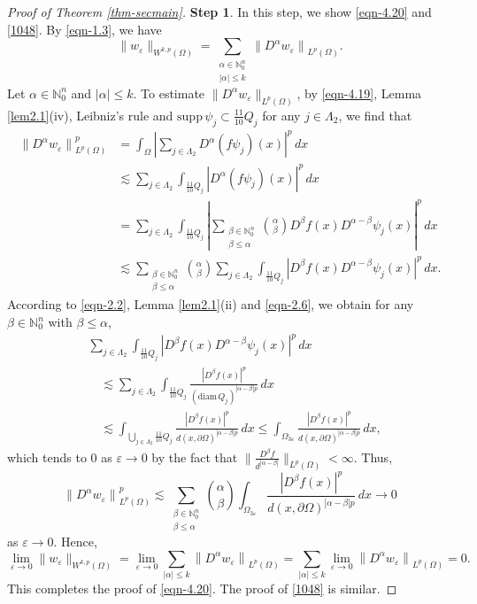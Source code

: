 \documentclass[11pt,twoside]{article}
\def\nn{{\mathbb N}}
\def\nno{\nn_0}
\def\Qj{\frac{11}{10}Q_j}
\def\az{\alpha}
\def\bz{\beta}
\def\boz{{\Omega}}
\def\pa{\partial}                %
\def\we{w_{\varepsilon}}
\def\huae{\varepsilon}
\theoremstyle{mylem}
\theoremstyle{definition}
\numberwithin{equation}{section}
\begin{document}
\begin{proof}[Proof of Theorem \ref{thm-secmain}]
{\bf Step 1}. In this step, we show \eqref{eqn-4.20}
and \eqref{1048}. By \eqref{eqn-1.3}, we have
\[
\| \we \|_{W^{k,p}(\boz)}=\sum_{\substack{\az\in\nno^n \\ |\alpha| \leq k}}
\left\| D^{\alpha}\we \right\|_{L^p(\Omega)}.
\]
Let $\az\in\nno^n$ and $|\az|\leq k$. To estimate \(\| D^{\alpha}\we \|_{L^p(\Omega)}\), by \eqref{eqn-4.19}, Lemma \ref{lem2.1}(iv), Leibniz's rule and \( \text{supp}\,\psi_j \subset \frac{11}{10}Q_j \) for any $j\in\Lambda_2$, we find that
\begin{align*}
\left\|D^{\alpha}\we\right\|_{L^p(\Omega)}^p
&= \int_{\boz} \left| \sum_{j \in \Lambda_2} D^{\alpha} (f \psi_j)(x) \right|^p\,dx\\
&\lesssim \sum_{j \in \Lambda_2} \int_{\Qj} | D^{\alpha} (f \psi_j)(x) |^p\,dx \\
&=\sum_{j \in \Lambda_2} \int_{\Qj} \left| \sum_{\substack{\bz\in\nno^n \\ \bz \leq \az}} \binom{\az}{\bz} D^{\bz}f(x) D^{\az - \bz} \psi_j(x) \right|^p\,dx \\
&\lesssim \sum_{\substack{\bz\in\nno^n \\ \bz \leq \az}} \binom{\az}{\bz} \sum_{j \in \Lambda_2} \int_{\Qj} | D^{\bz}f(x) D^{\az - \bz} \psi_j(x) |^p\,dx.
\end{align*}
According to \eqref{eqn-2.2}, Lemma \ref{lem2.1}(ii) and \eqref{eqn-2.6}, we obtain for any $\bz\in\nno^n$ with $\bz\leq\az$,
\begin{align*}
&\sum_{j \in \Lambda_2}\int_{\Qj} \left| D^{\bz}f(x) D^{\az - \bz} \psi_j(x) \right|^p\, dx\\
&\quad\lesssim \sum_{j \in \Lambda_2}\int_{\Qj} \frac{|D^{\bz}f(x)|^p}{(\mathrm{diam\,} Q_j)^{|\az-\bz|p}}\,dx\\
&\quad\lesssim \int_{\bigcup_{j \in \Lambda_2} \Qj} \frac{|D^{\bz}f(x)|^p}{d(x,\pa\boz)^{|\az-\bz|p}}\,dx 
\leq \int_{\boz_{3\huae}} \frac{|D^{\bz}f(x)|^p}{d(x,\pa\boz)^{|\az-\bz|p}}\,dx,
\end{align*}
which tends to 0 as \( \huae \to 0 \) by the fact
that $\|\frac{D^\beta f}{d^{|\alpha-\beta|}}\|_{L^p(\Omega)}<\infty$. Thus,
\[
\left\| D^{\alpha}\we\right\|_{L^p(\Omega)}^p \lesssim  \sum_{\substack{\bz\in\nno^n \\ \bz \leq \az}} \binom{\az}{\bz} \int_{\boz_{3\huae}} \frac{|D^{\bz}f(x)|^p}{d(x,\pa\boz)^{|\az-\bz|p}} \,dx \to 0
\]
as $\huae \to 0$.
Hence,
\[
\lim_{\huae \to 0} \| \we \|_{W^{k,p}(\Omega)}
=\lim_{\huae \to 0}  \sum_{|\alpha| \leq k} \left\| D^{\alpha}\we \right\|_{L^p(\Omega)}
=\sum_{|\alpha| \leq k} \lim_{\huae \to 0} \left\| D^{\alpha}\we \right\|_{L^p(\Omega)}=0.
\]
This completes the proof of \eqref{eqn-4.20}.
The proof of \eqref{1048} is similar.


\end{proof}
\end{document}
